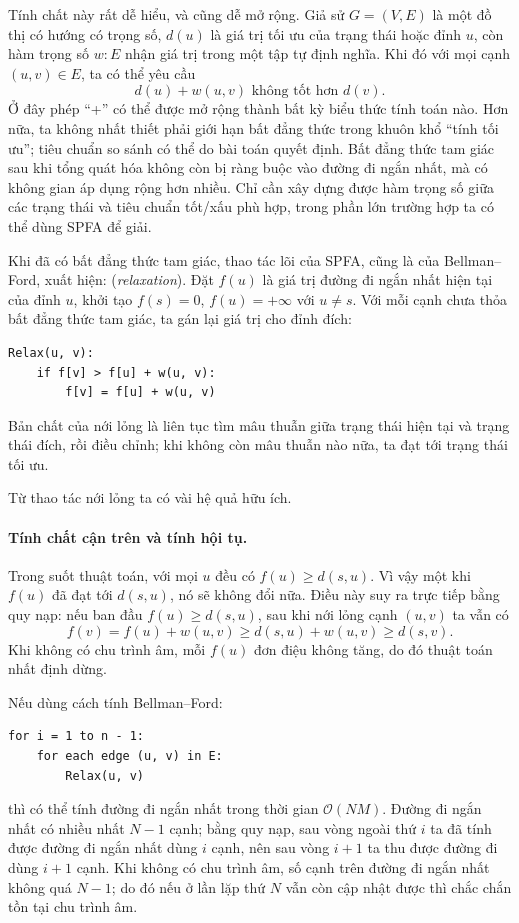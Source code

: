 \documentclass[11pt]{article}
\newcommand{\Oh}{\mathcal{O}}
\begin{document}
Tính chất này rất dễ hiểu, và cũng dễ mở rộng. Giả sử \(G=(V,E)\) là một đồ
thị có hướng có trọng số, \(d(u)\) là giá trị tối ưu của trạng thái hoặc đỉnh
\(u\), còn hàm trọng số \(w:E\) nhận giá trị trong một tập tự định nghĩa. Khi
đó với mọi cạnh \((u,v)\in E\), ta có thể yêu cầu
\[
  d(u)+w(u,v) \text{ không tốt hơn } d(v).
\]
Ở đây phép ``+'' có thể được mở rộng thành bất kỳ biểu thức tính toán nào.
Hơn nữa, ta không nhất thiết phải giới hạn bất đẳng thức trong khuôn khổ
``tính tối ưu''; tiêu chuẩn so sánh có thể do bài toán quyết định. Bất đẳng
thức tam giác sau khi tổng quát hóa không còn bị ràng buộc vào đường đi ngắn
nhất, mà có không gian áp dụng rộng hơn nhiều. Chỉ cần xây dựng được hàm trọng
số giữa các trạng thái và tiêu chuẩn tốt/xấu phù hợp, trong phần lớn trường
hợp ta có thể dùng SPFA để giải.

Khi đã có bất đẳng thức tam giác, thao tác lõi của SPFA, cũng là của
Bellman--Ford, xuất hiện:  (\textit{relaxation}). Đặt
\(f(u)\) là giá trị đường đi ngắn nhất hiện tại của đỉnh \(u\), khởi tạo
\(f(s)=0\), \(f(u)=+\infty\) với \(u\ne s\). Với mỗi cạnh chưa thỏa bất đẳng
thức tam giác, ta gán lại giá trị cho đỉnh đích:
\begin{verbatim}
Relax(u, v):
    if f[v] > f[u] + w(u, v):
        f[v] = f[u] + w(u, v)
\end{verbatim}

Bản chất của nới lỏng là liên tục tìm mâu thuẫn giữa trạng thái hiện tại và
trạng thái đích, rồi điều chỉnh; khi không còn mâu thuẫn nào nữa, ta đạt tới
trạng thái tối ưu.

Từ thao tác nới lỏng ta có vài hệ quả hữu ích.

\paragraph{Tính chất cận trên và tính hội tụ.}
Trong suốt thuật toán, với mọi \(u\) đều có \(f(u)\ge d(s,u)\). Vì vậy một khi
\(f(u)\) đã đạt tới \(d(s,u)\), nó sẽ không đổi nữa. Điều này suy ra trực tiếp
bằng quy nạp: nếu ban đầu \(f(u)\ge d(s,u)\), sau khi nới lỏng cạnh \((u,v)\)
ta vẫn có
\[
  f(v)=f(u)+w(u,v)\ge d(s,u)+w(u,v)\ge d(s,v).
\]
Khi không có chu trình âm, mỗi \(f(u)\) đơn điệu không tăng, do đó thuật toán
nhất định dừng.

Nếu dùng cách tính Bellman--Ford:
\begin{verbatim}
for i = 1 to n - 1:
    for each edge (u, v) in E:
        Relax(u, v)
\end{verbatim}
thì có thể tính đường đi ngắn nhất trong thời gian \(\Oh(NM)\). Đường đi ngắn
nhất có nhiều nhất \(N-1\) cạnh; bằng quy nạp, sau vòng ngoài thứ \(i\) ta đã
tính được đường đi ngắn nhất dùng \(i\) cạnh, nên sau vòng \(i+1\) ta thu được
đường đi dùng \(i+1\) cạnh. Khi không có chu trình âm, số cạnh trên đường đi
ngắn nhất không quá \(N-1\); do đó nếu ở lần lặp thứ \(N\) vẫn còn cập nhật
được thì chắc chắn tồn tại chu trình âm.
\end{document}
